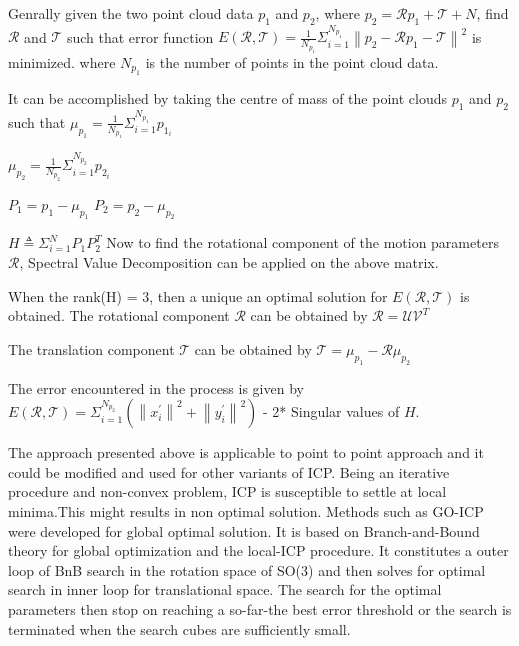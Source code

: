 Genrally given the two point cloud data $p_1$ and $p_2$, where $p_2 = \mathcal{R}p_1 + \mathcal{T} + N$, find $\mathcal{R}$ and $\mathcal{T}$ such that error function
$E(\mathcal{R}, \mathcal{T}) = \frac{1}{N_{p_1}}  \Sigma_{i=1}^{N_{p_1}}\left\lVert p_2 - \mathcal{R} p_1 -\mathcal{T} \right\rVert^2 $  is minimized.
where $N_{p_1}$ is the number of points in the point cloud data.

It can be accomplished by taking the centre of mass of the point clouds $p_1$ and $p_2$ such that
$\mu_{p_1}  = \frac{1}{N_{p_1}} \Sigma_{i=1}^{N_{p_1}} p_{1_i}$

$\mu_{p_2}  = \frac{1}{N_{p_2}} \Sigma_{i=1}^{N_{p_2}} p_{2_i}$

$P_1 = p_1 - \mu_{p_1}$
$P_2 = p_2 - \mu_{p_2}$

$ H \triangleq  \Sigma_{i=1}^{N} P_1 P_2^T$ 
Now to find the rotational component of the motion parameters $\mathcal{R}$, 
Spectral Value Decomposition can be applied on the above matrix.

When the rank(H) = 3, then a unique an optimal solution for $E(\mathcal{R}, \mathcal{T})$ is obtained.
The rotational component $\mathcal{R}$ can be obtained by 
$\mathcal{R} = \mathcal{U} \mathcal{V}^T$

The translation component $\mathcal{T}$ can be obtained by 
$\mathcal{T} = \mu_{p_1} - \mathcal{R}\mu_{p_2} $

The error encountered in the process is given by 
$E(\mathcal{R}, \mathcal{T}) = \Sigma_{i=1}^{N_{p_2}}(\left\lVert x_i^{'} \right\rVert^2 + \left\lVert y_i^{'} \right\rVert^2)$ - 2* Singular values of $H$.

The approach presented above is applicable to point to point approach and it could be modified and used for other variants of ICP. Being an iterative procedure and non-convex problem, ICP is susceptible to settle at local 
minima.This might results in non optimal solution. Methods such as GO-ICP \cite{Yang_2016} were developed for global optimal solution. It is based on Branch-and-Bound theory for global optimization and the local-ICP procedure.
It constitutes a outer loop of BnB search in the rotation space of SO(3) and then solves for optimal search in inner loop for translational space. The search for the optimal parameters then stop on reaching
a so-far-the best error threshold or the search is terminated when the search cubes are sufficiently small. 

